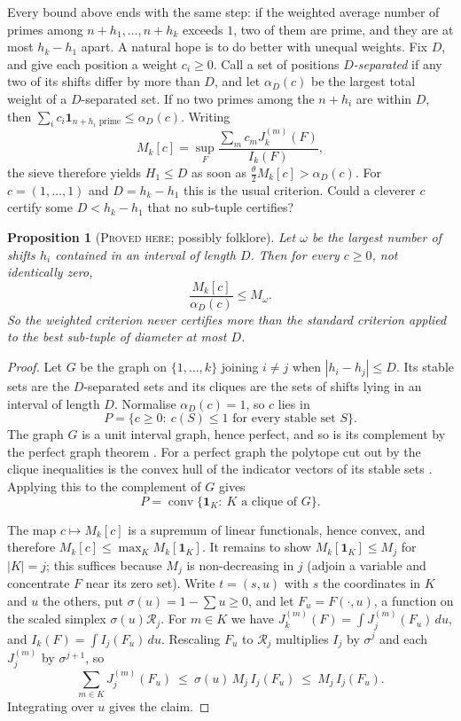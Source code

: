 \documentclass[11pt]{amsart}
\newtheorem{proposition}[theorem]{Proposition}
\theoremstyle{definition}
\theoremstyle{remark}
\newcommand{\lbl}[1]{\textup{\textsc{#1}}}
\newcommand{\R}{\mathcal{R}}
\begin{document}
Every bound above ends with the same step: if the weighted average number of
primes among $n+h_1,\dots,n+h_k$ exceeds $1$, two of them are prime, and they
are at most $h_k-h_1$ apart. A natural hope is to do better with unequal
weights. Fix $D$, and give each position a weight $c_i\ge0$. Call a set of
positions \emph{$D$-separated} if any two of its shifts differ by more than
$D$, and let $\alpha_D(c)$ be the largest total weight of a $D$-separated set.
If no two primes among the $n+h_i$ are within $D$, then
$\sum_ic_i\mathbf 1_{n+h_i\text{ prime}}\le\alpha_D(c)$. Writing
\[
M_k[c]=\sup_F\frac{\sum_{m}c_mJ_k^{(m)}(F)}{I_k(F)},
\]
the sieve therefore yields $H_1\le D$ as soon as
$\tfrac{\theta}{2}M_k[c]>\alpha_D(c)$. For $c=(1,\dots,1)$ and $D=h_k-h_1$
this is the usual criterion. Could a cleverer $c$ certify some $D<h_k-h_1$
that no sub-tuple certifies?

\begin{proposition}[\lbl{Proved here}; possibly folklore]\label{prop:rigid}
Let $\omega$ be the largest number of shifts $h_i$ contained in an interval of
length $D$. Then for every $c\ge0$, not identically zero,
\[
\frac{M_k[c]}{\alpha_D(c)}\le M_\omega .
\]
So the weighted criterion never certifies more than the standard criterion
applied to the best sub-tuple of diameter at most $D$.
\end{proposition}

\begin{proof}
Let $G$ be the graph on $\{1,\dots,k\}$ joining $i\ne j$ when
$|h_i-h_j|\le D$. Its stable sets are the $D$-separated sets and its cliques
are the sets of shifts lying in an interval of length $D$. Normalise
$\alpha_D(c)=1$, so $c$ lies in
\[P=\{c\ge0:\ c(S)\le1\text{ for every stable set }S\}.\] The graph $G$ is a
unit interval graph, hence perfect, and so is its complement by the perfect
graph theorem \cite{Lov72}. For a perfect graph the polytope cut out by the
clique inequalities is the convex hull of the indicator vectors of its stable
sets \cite{Chv75}. Applying this to the complement of $G$ gives
\[P=\operatorname{conv}\{\mathbf 1_K:\ K\text{ a clique of }G\}.\]

The map $c\mapsto M_k[c]$ is a supremum of linear functionals, hence convex,
and therefore $M_k[c]\le\max_KM_k[\mathbf 1_K]$. It remains to show
$M_k[\mathbf 1_K]\le M_{j}$ for $|K|=j$; this suffices because $M_j$ is
non-decreasing in $j$ (adjoin a variable and concentrate $F$ near its zero
set). Write $t=(s,u)$ with $s$ the coordinates in $K$ and $u$ the others, put
$\sigma(u)=1-\sum u\ge0$, and let $F_u=F(\cdot,u)$, a function on the scaled
simplex $\sigma(u)\R_j$. For $m\in K$ we have
$J_k^{(m)}(F)=\int J_j^{(m)}(F_u)\,du$, and $I_k(F)=\int I_j(F_u)\,du$.
Rescaling $F_u$ to $\R_j$ multiplies $I_j$ by $\sigma^{j}$ and each
$J_j^{(m)}$ by $\sigma^{j+1}$, so
\[
\sum_{m\in K}J_j^{(m)}(F_u)\ \le\ \sigma(u)\,M_j\,I_j(F_u)\ \le\ M_j\,I_j(F_u).
\]
Integrating over $u$ gives the claim.
\end{proof}
\end{document}
